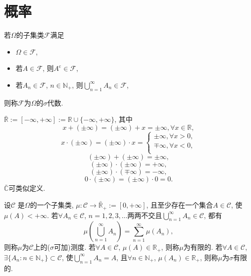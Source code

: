 \chapter{概率}

\begin{definition}
    若$\Omega$的子集类$\mathcal{F}$满足\begin{itemize}
        \item $\Omega\in\mathcal{F}$,
        \item 若$A\in\mathcal{F}$, 则$A^\text{c}\in\mathcal{F}$,
        \item 若$A_n\in\mathcal{F}$, $n\in \mathbb{N}_+$, 则$\bigcup_{n=1}^{\infty}A_n\in\mathcal{F}$,
    \end{itemize}则称$\mathcal{F}$为$\Omega$的$\sigma$代数.
\end{definition}

\begin{definition}
    $\bar{\mathbb{R} }:=[-\infty,+\infty]:=\mathbb{R}\cup\{-\infty,+\infty\}$, 其中\begin{equation*}
        x+(\pm\infty)=(\pm\infty)+x=\pm\infty, \forall x\in\mathbb{R},
    \end{equation*}\begin{equation*}
        x\cdot(\pm\infty)=(\pm\infty)\cdot x=\begin{cases}
            \pm\infty,\forall x>0,\\
            \mp\infty,\forall x<0,\\
        \end{cases}
    \end{equation*}\begin{equation*}
        (\pm\infty)+(\pm\infty)=\pm\infty,
    \end{equation*}\begin{equation*}
        (\pm\infty)\cdot(\pm\infty)=+\infty,
    \end{equation*}\begin{equation*}
        (\pm\infty)\cdot(\mp\infty)=-\infty,
    \end{equation*}\begin{equation*}
        0\cdot(\pm\infty)=(\pm\infty)\cdot0=0.
    \end{equation*}$\bar{\mathbb{C} }$可类似定义.
\end{definition}

\begin{definition}
    设$\mathcal{C}$ 是$\Omega$的一个子集类, $\mu:\mathcal{C}\to\bar{\mathbb{R} }_+:=[0,+\infty]$, 且至少存在一个集合$A\in\mathcal{C}$, 使$\mu(A)<+\infty$. 若$\forall A_n\in\mathcal{C}$, $n=1,2,3,\dots$两两不交且$\bigcup_{n=1}^{\infty}A_n\in\mathcal{C}$, 都有\begin{equation*}
        \mu\left(\bigcup_{n=1}^{\infty}A_n\right)=\sum_{n=1}^{\infty}\mu\left(A_n\right),
    \end{equation*}则称$\mu$为$\mathcal{C}$上的($\sigma$可加)测度. 若$\forall A\in\mathcal{C}$, $\mu(A)\in\mathbb{R}_+$, 则称$\mu$为有限的. 若$\forall A\in\mathcal{C}$, $\exists\{A_n:n\in\mathbb{N}_+\}\subset\mathcal{C} $, 使$\bigcup_{n=1}^{\infty}A_n=A$, 且$\forall n\in\mathbb{N}_+$, $\mu(A_n)\in\mathbb{R}_+$, 则称$\mu$为$\sigma$有限的. 
\end{definition}

